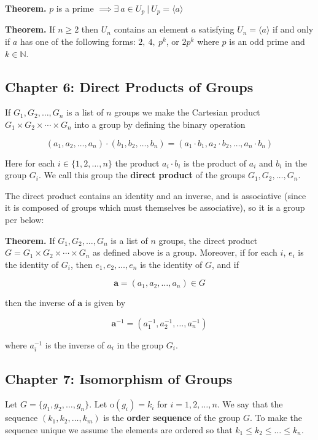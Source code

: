 \documentclass{article}
\begin{document}
\textbf{Theorem.} \(p\) is a prime \(\implies \exists \ a \in U_p \ | \ U_p = \langle a \rangle\)

\textbf{Theorem.} If \(n \geq 2\) then \(U_n\) contains an element \(a\) satisfying \(U_n = \langle a \rangle\) if and only if \(a\) has one of the following forms: \(2, \ 4, \ p^k\), or \(2p^k\) where \(p\) is an odd prime and \(k \in \mathbb{N}\).

\subsection{Chapter 6: Direct Products of Groups}

If \(G_1, G_2, \ldots, G_n\) is a list of \(n\) groups we make the Cartesian product \(G_1 \times G_2 \times \cdots \times G_n\) into a group by defining the binary operation

\[
(a_1, a_2, \ldots, a_n) \cdot (b_1, b_2, \ldots, b_n) = (a_1 \cdot b_1, a_2 \cdot b_2, \ldots, a_n \cdot b_n)
\]

Here for each \(i \in \{1, 2, \ldots, n\}\) the product \(a_i \cdot b_i\) is the product of \(a_i\) and \(b_i\) in the group \(G_i\). We call this group the \textbf{direct product} of the groups \(G_1, G_2, \ldots, G_n\).

The direct product contains an identity and an inverse, and is associative (since it is composed of groups which must themselves be associative), so it is a group per below:

\textbf{Theorem.} If \(G_1, G_2, \ldots, G_n\) is a list of \(n\) groups, the direct product \(G = G_1 \times G_2 \times \cdots \times G_n\) as defined above is a group. Moreover, if for each \(i\), \(e_i\) is the identity of \(G_i\), then \(e_1, e_2, \ldots, e_n\) is the identity of \(G\), and if 

\[
\boldsymbol{a} = (a_1, a_2, \ldots, a_n) \in G
\]

then the inverse of \(\boldsymbol{a}\) is given by

\[
\boldsymbol{a}^{-1} = (a_1^{-1}, a_2^{-1}, \ldots, a_n^{-1})
\]

where \(a_i^{-1}\) is the inverse of \(a_i\) in the group \(G_i\).

\pagebreak
\subsection{Chapter 7: Isomorphism of Groups}

Let \(G = \{g_1, g_2, \ldots, g_n \}\). Let \(\text{o}(g_i) = k_i\) for \(i = 1, 2 , \ldots, n\). We say that the sequence \((k_1, k_2, \ldots, k_m) \) is the \textbf{order sequence} of the group \(G\). To make the sequence unique we assume the elements are ordered so that \(k_1 \leq k_2 \leq \ldots \leq k_n\).
\end{document}
